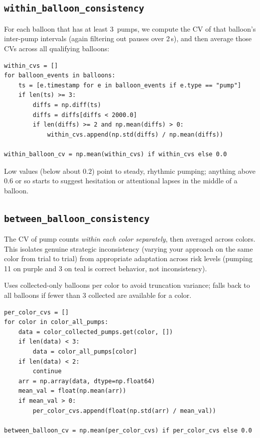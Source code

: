 \documentclass[11pt,a4paper]{article}
\begin{document}
\subsection{\texttt{within\_balloon\_consistency}}

For each balloon that has at least 3~pumps, we compute the CV of that balloon's
inter-pump intervals (again filtering out pauses over 2\,s), and then average
those CVs across all qualifying balloons:

\begin{lstlisting}[style=pythonstyle]
within_cvs = []
for balloon_events in balloons:
    ts = [e.timestamp for e in balloon_events if e.type == "pump"]
    if len(ts) >= 3:
        diffs = np.diff(ts)
        diffs = diffs[diffs < 2000.0]
        if len(diffs) >= 2 and np.mean(diffs) > 0:
            within_cvs.append(np.std(diffs) / np.mean(diffs))

within_balloon_cv = np.mean(within_cvs) if within_cvs else 0.0
\end{lstlisting}

Low values (below about $0.2$) point to steady, rhythmic pumping; anything
above $0.6$ or so starts to suggest hesitation or attentional lapses in the
middle of a balloon.


\subsection{\texttt{between\_balloon\_consistency}}

The CV of pump counts \emph{within each color separately}, then averaged
across colors. This isolates genuine strategic inconsistency (varying your
approach on the same color from trial to trial) from appropriate adaptation
across risk levels (pumping 11 on purple and 3 on teal is correct behavior,
not inconsistency).

Uses collected-only balloons per color to avoid truncation variance; falls
back to all balloons if fewer than 3 collected are available for a color.

\begin{lstlisting}[style=pythonstyle]
per_color_cvs = []
for color in color_all_pumps:
    data = color_collected_pumps.get(color, [])
    if len(data) < 3:
        data = color_all_pumps[color]
    if len(data) < 2:
        continue
    arr = np.array(data, dtype=np.float64)
    mean_val = float(np.mean(arr))
    if mean_val > 0:
        per_color_cvs.append(float(np.std(arr) / mean_val))

between_balloon_cv = np.mean(per_color_cvs) if per_color_cvs else 0.0
\end{lstlisting}
\end{document}
